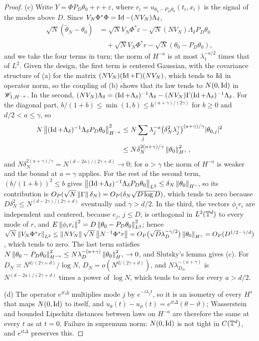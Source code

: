 \begin{proof}
(c) Write $Y=\Phi P_D\theta_0+r+\varepsilon$, where $r_i=u_{\theta_0-P_D\theta_0}(t_i,x_i)$ is the signal of the modes above $D$. Since $V_N\Phi^*\Phi=\operatorname{Id}-(NV_N)\Lambda_\delta$,
\[
\begin{aligned}
\sqrt N(\tilde\theta_N-\theta_0)&=\sqrt NV_N\Phi^*\varepsilon-\sqrt N(NV_N)\Lambda_\delta P_D\theta_0\\
&\quad+\sqrt NV_N\Phi^*r-\sqrt N(\theta_0-P_D\theta_0),
\end{aligned}
\]
and we take the four terms in turn; the norm of $H^{-a}$ is at most $\lambda_1^{-a/2}$ times that of $L^2$. Given the design, the first term is centered Gaussian, with the covariance structure of (a) for the matrix $(NV_N)(\operatorname{Id}+\Gamma)(NV_N)$, which tends to $\operatorname{Id}$ in operator norm, so the coupling of (b) shows that its law tends to $N(0,\operatorname{Id})$ in $\mathscr{W}_{1,H^{-a}}$. In the second, $(NV_N)\Lambda_\delta=(\operatorname{Id}+\Lambda_\delta)^{-1}\Lambda_\delta-(NV_N)\Gamma(\operatorname{Id}+\Lambda_\delta)^{-1}\Lambda_\delta$. For the diagonal part, $b/(1+b)\le\min(1,b)\le b^{(a+\gamma)/(2\gamma)}$ for $b\ge0$ and $d/2<a\le\gamma$, so
\[
\begin{aligned}
N\left\|(\operatorname{Id}+\Lambda_\delta)^{-1}\Lambda_\delta P_D\theta_0\right\|^2_{H^{-a}}&\le N\sum_j\lambda_j^{-a}\big(\delta_N^2\lambda_j^\gamma\big)^{(a+\gamma)/\gamma}|\theta_{0,j}|^2\\
&\le N\delta_N^{2(a+\gamma)/\gamma}\left\|\theta_0\right\|^2_{H^\gamma},
\end{aligned}
\]
and $N\delta_N^{2(a+\gamma)/\gamma}=N^{(d-2a)/(2\gamma+d)}\to0$; for $a>\gamma$ the norm of $H^{-a}$ is weaker and the bound at $a=\gamma$ applies. For the rest of the second term, $(b/(1+b))^2\le b$ gives $\left\|(\operatorname{Id}+\Lambda_\delta)^{-1}\Lambda_\delta P_D\theta_0\right\|_{L^2}\le\delta_N\left\|\theta_0\right\|_{H^\gamma}$, so its contribution is $O_P(\sqrt N\left\|\Gamma\right\|\delta_N)=O_P(\delta_N\sqrt{D\log D})$, which tends to zero because $D\delta_N^2\le N^{(d-2\gamma)/(2\gamma+d)}$ eventually and $\gamma>d/2$. In the third, the vectors $\phi_ir_i$ are independent and centered, because $e_j$, $j\le D$, is orthogonal in $L^2(\mathbb{T}^d)$ to every mode of $r$, and $E\left\|\phi_ir_i\right\|^2=D\left\|\theta_0-P_D\theta_0\right\|^2_{L^2}$; hence $\sqrt N\left\|V_N\Phi^*r\right\|_{L^2}\le\left\|NV_N\right\|\sqrt N\left\|N^{-1}\Phi^*r\right\|=O_P\big(\sqrt D\lambda_D^{-\gamma/2}\big)\left\|\theta_0\right\|_{H^\gamma}=O_P(D^{1/2-\gamma/d})$, which tends to zero. The last term satisfies $N\left\|\theta_0-P_D\theta_0\right\|^2_{H^{-a}}\le N\lambda_D^{-(a+\gamma)}\left\|\theta_0\right\|^2_{H^\gamma}\to0$, and Slutsky's lemma gives (c). For $D_N\asymp N^{d/(2\gamma+d)}/\log N$, $D_N=o(N^{d/(2\gamma+d)})$, and $N\lambda_{D_N}^{-(a+\gamma)}$ is $N^{(d-2a)/(2\gamma+d)}$ times a power of $\log N$, which tends to zero for every $a>d/2$.

(d) The operator $e^{it\Delta}$ multiplies mode $j$ by $e^{-i\lambda_jt}$, so it is an isometry of every $H^s$ that maps $N(0,\operatorname{Id})$ to itself, and $u_\theta(t)-u_{\vartheta}(t)=e^{it\Delta}(\theta-\vartheta)$; Wasserstein and bounded Lipschitz distances between laws on $H^{-a}$ are therefore the same at every $t$ as at $t=0$. Failure in supremum norm: $N(0,\operatorname{Id})$ is not tight in $C(\mathbb{T}^d)$, and $e^{it\Delta}$ preserves this.
\end{proof}

